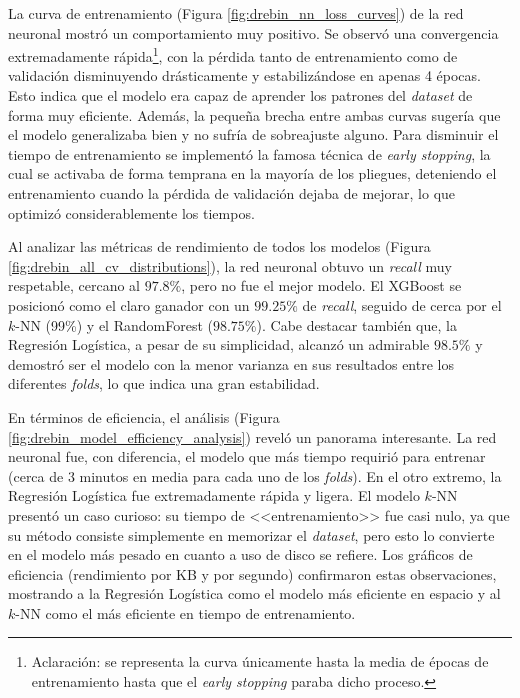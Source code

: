 
La curva de entrenamiento (Figura \ref{fig:drebin_nn_loss_curves}) de la red neuronal mostró un comportamiento muy positivo. Se observó una convergencia extremadamente rápida\footnote{Aclaración: se representa la curva únicamente hasta la media de épocas de entrenamiento hasta que el \textit{early stopping} paraba dicho proceso.}, con la pérdida tanto de entrenamiento como de validación disminuyendo drásticamente y estabilizándose en apenas 4 épocas. Esto indica que el modelo era capaz de aprender los patrones del \textit{dataset} de forma muy eficiente. Además, la pequeña brecha entre ambas curvas sugería que el modelo generalizaba bien y no sufría de sobreajuste alguno. Para disminuir el tiempo de entrenamiento se implementó la famosa técnica de \textit{early stopping}, la cual se activaba de forma temprana en la mayoría de los pliegues, deteniendo el entrenamiento cuando la pérdida de validación dejaba de mejorar, lo que optimizó considerablemente los tiempos.


Al analizar las métricas de rendimiento de todos los modelos (Figura \ref{fig:drebin_all_cv_distributions}), la red neuronal obtuvo un \textit{recall} muy respetable, cercano al $97.8\%$, pero no fue el mejor modelo. El XGBoost se posicionó como el claro ganador con un $99.25\%$ de \textit{recall}, seguido de cerca por el $k$-NN (99\%) y el RandomForest ($98.75\%$). Cabe destacar también que, la Regresión Logística, a pesar de su simplicidad, alcanzó un admirable $98.5\%$ y demostró ser el modelo con la menor varianza en sus resultados entre los diferentes \textit{folds}, lo que indica una gran estabilidad.


En términos de eficiencia, el análisis (Figura \ref{fig:drebin_model_efficiency_analysis}) reveló un panorama interesante. La red neuronal fue, con diferencia, el modelo que más tiempo requirió para entrenar (cerca de 3 minutos en media para cada uno de los \textit{folds}). En el otro extremo, la Regresión Logística fue extremadamente rápida y ligera. El modelo $k$-NN presentó un caso curioso: su tiempo de <<entrenamiento>> fue casi nulo, ya que su método consiste simplemente en memorizar el \textit{dataset}, pero esto lo convierte en el modelo más pesado en cuanto a uso de disco se refiere. Los gráficos de eficiencia (rendimiento por KB y por segundo) confirmaron estas observaciones, mostrando a la Regresión Logística como el modelo más eficiente en espacio y al $k$-NN como el más eficiente en tiempo de entrenamiento.

